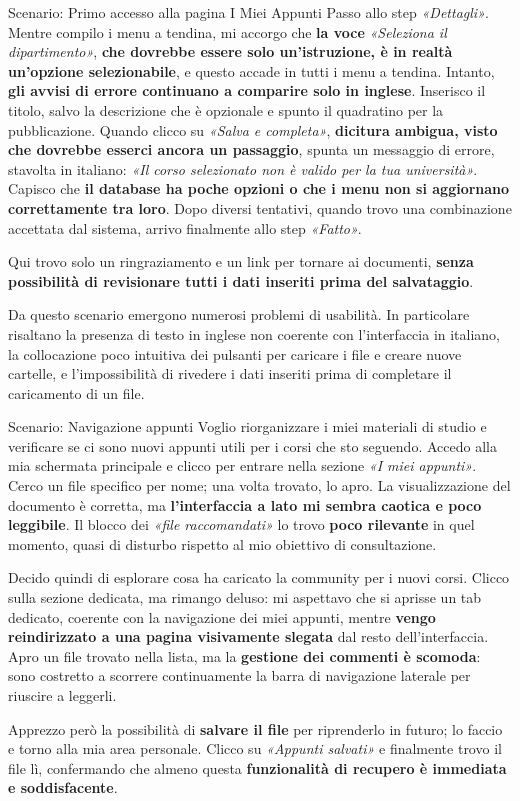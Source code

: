 \begin{scenario}{Scenario: Primo accesso alla pagina I Miei Appunti}
  Passo allo step \textit{«Dettagli»}. Mentre compilo i menu a tendina, mi accorgo che \textbf{la voce} \textit{«Seleziona il dipartimento»}, \textbf{che dovrebbe essere solo un'istruzione, è in realtà un'opzione selezionabile}, e questo accade in tutti i menu a tendina. Intanto, \textbf{gli avvisi di errore continuano a comparire solo in inglese}. Inserisco il titolo, salvo la descrizione che è opzionale e spunto il quadratino per la
  pubblicazione. Quando clicco su \textit{«Salva e completa»}, \textbf{dicitura
  ambigua, visto che dovrebbe esserci ancora un passaggio}, spunta un messaggio di errore, stavolta in italiano: \textit{«Il corso selezionato non è valido per la tua università»}.
  Capisco che \textbf{il database ha poche opzioni o che i menu non si aggiornano
  correttamente tra loro}. Dopo diversi tentativi, quando trovo una combinazione accettata dal sistema, arrivo finalmente allo step \textit{«Fatto»}.

  Qui trovo solo un ringraziamento e un link per tornare ai documenti, \textbf{senza possibilità di revisionare tutti i dati inseriti prima del salvataggio}.
\end{scenario}

Da questo scenario emergono numerosi problemi di usabilità. In particolare risaltano la presenza di testo in inglese non coerente con l'interfaccia in italiano, la collocazione poco intuitiva dei pulsanti per caricare i file e creare nuove cartelle, e l'impossibilità di rivedere i dati inseriti prima di completare il caricamento di un file.

\begin{scenario}{Scenario: Navigazione appunti}
  Voglio riorganizzare i miei materiali di studio e verificare se ci sono nuovi appunti utili per i corsi che sto seguendo. Accedo alla mia schermata principale e clicco per entrare nella sezione
  \textit{«I miei appunti»}. Cerco un file specifico per nome; una volta trovato, lo apro. La visualizzazione del documento è corretta, ma \textbf{l'interfaccia a lato mi sembra caotica e poco leggibile}. Il blocco dei \textit{«file raccomandati»} lo trovo \textbf{poco rilevante} in quel momento, quasi di disturbo rispetto al mio obiettivo di consultazione.

  Decido quindi di esplorare cosa ha caricato la community per i nuovi corsi. Clicco sulla sezione dedicata, ma rimango deluso: mi aspettavo che si aprisse un tab dedicato, coerente con la navigazione dei miei appunti, mentre \textbf{vengo reindirizzato a una pagina visivamente slegata} dal resto dell'interfaccia. Apro un file trovato nella lista, ma la \textbf{gestione dei commenti è scomoda}: sono costretto a scorrere continuamente
  la barra di navigazione laterale per riuscire a leggerli.

  Apprezzo però la possibilità di \textbf{salvare il file} per riprenderlo in futuro; lo faccio e torno alla mia area personale. Clicco su \textit{«Appunti salvati»} e finalmente trovo il file lì, confermando che almeno questa \textbf{funzionalità di recupero è immediata e soddisfacente}.
\end{scenario}


